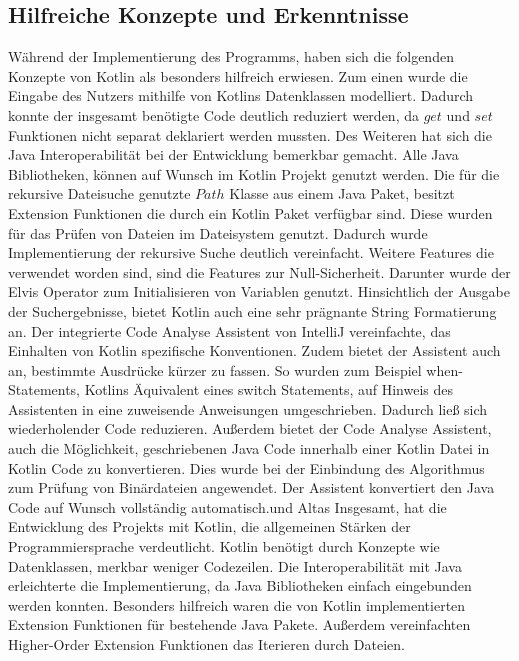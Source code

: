 \documentclass{article}
\begin{document}
\subsection{Hilfreiche Konzepte und Erkenntnisse}
Während der Implementierung des Programms, haben sich die folgenden Konzepte von Kotlin als besonders hilfreich erwiesen. Zum einen wurde die Eingabe des Nutzers mithilfe von Kotlins Datenklassen modelliert. Dadurch konnte der insgesamt benötigte Code deutlich reduziert werden, da $get$ und $set$ Funktionen nicht separat deklariert werden mussten. Des Weiteren hat sich die Java Interoperabilität bei der Entwicklung bemerkbar gemacht. Alle Java Bibliotheken, können auf Wunsch im Kotlin Projekt genutzt werden. Die für die rekursive Dateisuche genutzte $Path$ Klasse aus einem Java Paket, besitzt Extension Funktionen die durch ein Kotlin Paket verfügbar sind. Diese wurden für das Prüfen von Dateien im Dateisystem genutzt. Dadurch wurde Implementierung der rekursive Suche deutlich vereinfacht. Weitere Features die verwendet worden sind, sind die Features zur Null-Sicherheit. Darunter wurde der Elvis Operator zum Initialisieren von Variablen genutzt. Hinsichtlich der Ausgabe der Suchergebnisse, bietet Kotlin auch eine sehr prägnante String Formatierung an. \newline
Der integrierte Code Analyse Assistent von IntelliJ vereinfachte, das Einhalten von Kotlin spezifische Konventionen. Zudem bietet der Assistent auch an, bestimmte Ausdrücke kürzer zu fassen. So wurden zum Beispiel when-Statements, Kotlins Äquivalent eines switch Statements, auf Hinweis des Assistenten in eine zuweisende Anweisungen umgeschrieben. Dadurch ließ sich wiederholender Code reduzieren. Außerdem bietet der Code Analyse Assistent, auch die Möglichkeit, geschriebenen Java Code innerhalb einer Kotlin Datei in Kotlin Code zu konvertieren. Dies wurde bei der Einbindung des Algorithmus zum Prüfung von Binärdateien angewendet. Der Assistent konvertiert den Java Code auf Wunsch vollständig automatisch.\newlineAdobe und Altas
Insgesamt, hat die Entwicklung des Projekts mit Kotlin, die allgemeinen Stärken der Programmiersprache verdeutlicht. Kotlin benötigt durch Konzepte wie Datenklassen, merkbar weniger Codezeilen. Die Interoperabilität mit Java erleichterte die Implementierung, da Java Bibliotheken einfach eingebunden werden konnten. Besonders hilfreich waren die von Kotlin implementierten Extension Funktionen für bestehende Java Pakete. Außerdem vereinfachten Higher-Order Extension Funktionen das Iterieren durch Dateien.
\end{document}
